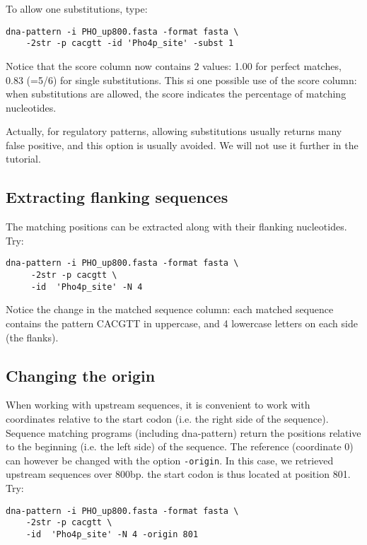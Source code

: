 To allow one substitutions, type:
\begin{verbatim}
dna-pattern -i PHO_up800.fasta -format fasta \
    -2str -p cacgtt -id 'Pho4p_site' -subst 1
\end{verbatim}

Notice that the score column now contains 2 values: 1.00 for perfect
matches, 0.83 (=5/6) for single substitutions. This si one possible
use of the score column: when substitutions are allowed, the score
indicates the percentage of matching nucleotides.

Actually, for regulatory patterns, allowing substitutions usually
returns many false positive, and this option is usually avoided. We
will not use it further in the tutorial.

\subsection{Extracting flanking sequences}

The matching positions can be extracted along with their flanking nucleotides. Try:

\begin{verbatim}
dna-pattern -i PHO_up800.fasta -format fasta \
     -2str -p cacgtt \
     -id  'Pho4p_site' -N 4
\end{verbatim}

Notice the change in the matched sequence column: each matched
sequence contains the pattern CACGTT in uppercase, and 4 lowercase
letters on each side (the flanks).

\subsection{Changing the origin}

When working with upstream sequences, it is convenient to work with
coordinates relative to the start codon (i.e. the right side of the
sequence). Sequence matching programs (including dna-pattern) return
the positions relative to the beginning (i.e. the left side) of the
sequence. The reference (coordinate 0) can however be changed with
the option \texttt{-origin}. In this case, we retrieved upstream
sequences over 800bp. the start codon is thus located at position
801. Try:

\begin{verbatim}
dna-pattern -i PHO_up800.fasta -format fasta \
    -2str -p cacgtt \
    -id  'Pho4p_site' -N 4 -origin 801
\end{verbatim}

